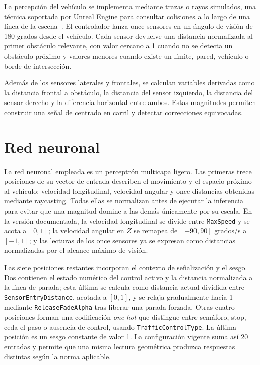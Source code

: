La percepción del vehículo se implementa mediante trazas o rayos simulados, una técnica soportada por Unreal Engine para consultar colisiones a lo largo de una línea de la escena~\cite{traces}. El controlador lanza once sensores en un ángulo de visión de 180 grados desde el vehículo. Cada sensor devuelve una distancia normalizada al primer obstáculo relevante, con valor cercano a 1 cuando no se detecta un obstáculo próximo y valores menores cuando existe un límite, pared, vehículo o borde de intersección.

Además de los sensores laterales y frontales, se calculan variables derivadas como la distancia frontal a obstáculo, la distancia del sensor izquierdo, la distancia del sensor derecho y la diferencia horizontal entre ambos. Estas magnitudes permiten construir una señal de centrado en carril y detectar correcciones equivocadas.

\section{Red neuronal}

La red neuronal empleada es un perceptrón multicapa ligero. Las primeras trece posiciones de su vector de entrada describen el movimiento y el espacio próximo al vehículo: velocidad longitudinal, velocidad angular y once distancias obtenidas mediante raycasting. Todas ellas se normalizan antes de ejecutar la inferencia para evitar que una magnitud domine a las demás únicamente por su escala. En la versión documentada, la velocidad longitudinal se divide entre \texttt{MaxSpeed} y se acota a \([0,1]\); la velocidad angular en \(Z\) se remapea de \([-90,90]\) grados/s a \([-1,1]\); y las lecturas de los once sensores ya se expresan como distancias normalizadas por el alcance máximo de visión.

Las siete posiciones restantes incorporan el contexto de señalización y el sesgo. Dos contienen el estado numérico del control activo y la distancia normalizada a la línea de parada; esta última se calcula como distancia actual dividida entre \texttt{SensorEntryDistance}, acotada a \([0,1]\), y se relaja gradualmente hacia 1 mediante \texttt{ReleaseFadeAlpha} tras liberar una parada forzada. Otras cuatro posiciones forman una codificación \textit{one-hot} que distingue entre semáforo, stop, ceda el paso o ausencia de control, usando \texttt{TrafficControlType}. La última posición es un sesgo constante de valor 1. La configuración vigente suma así 20 entradas y permite que una misma lectura geométrica produzca respuestas distintas según la norma aplicable.

